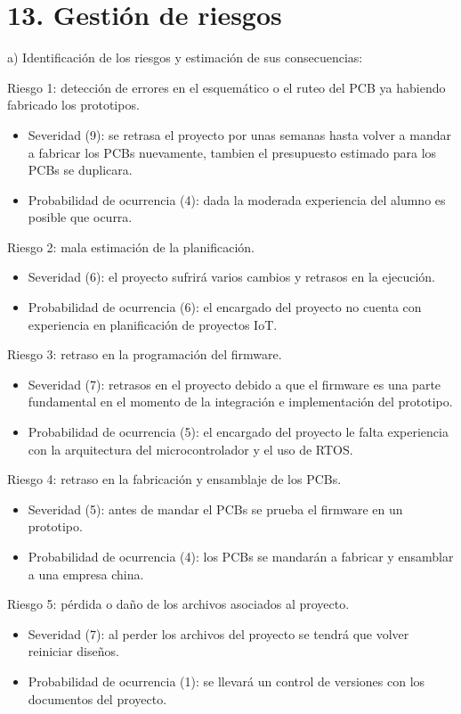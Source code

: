 \documentclass[
11pt, %
codirector, %
]{charter}
\begin{document}
\section{13. Gestión de riesgos}
\label{sec:riesgos}
a) Identificación de los riesgos y estimación de sus consecuencias:

Riesgo 1: detección de errores en el esquemático o el ruteo del PCB ya habiendo fabricado los prototipos.
\begin{itemize}
	\item Severidad (9): se retrasa el proyecto por unas semanas hasta volver a mandar a fabricar los PCBs nuevamente, tambien el presupuesto estimado para los PCBs se duplicara.
	\item Probabilidad de ocurrencia (4): dada la moderada experiencia del alumno es posible que ocurra.
\end{itemize}  

Riesgo 2: mala estimación de la planificación.
\begin{itemize}
	\item Severidad (6): el proyecto sufrirá varios cambios y retrasos en la ejecución.
	\item Probabilidad de ocurrencia (6): el encargado del proyecto no cuenta con experiencia en planificación de proyectos IoT.
\end{itemize}

Riesgo 3: retraso en la programación del firmware.
\begin{itemize}
	\item Severidad (7): retrasos en el proyecto debido a que el firmware es una parte fundamental en el momento de la integración e implementación del prototipo.
	\item Probabilidad de ocurrencia (5): el encargado del proyecto le falta experiencia con la arquitectura del microcontrolador y el uso de RTOS.
\end{itemize}  

Riesgo 4: retraso en la fabricación y ensamblaje de los PCBs.
\begin{itemize}
	\item Severidad (5): antes de mandar el PCBs se prueba el firmware en un prototipo.
	\item Probabilidad de ocurrencia (4): los PCBs se mandarán a fabricar y ensamblar a una empresa china. 
\end{itemize}

Riesgo 5: pérdida o daño de los archivos asociados al proyecto.
\begin{itemize}
	\item Severidad (7): al perder los archivos del proyecto se tendrá que volver reiniciar diseños.
	\item Probabilidad de ocurrencia (1): se llevará un control de versiones con los documentos del proyecto.
\end{itemize}  
\end{document}
